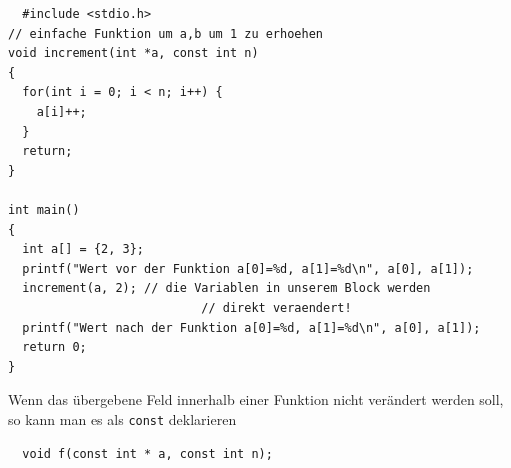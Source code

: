 \begin{minipage}{\linewidth}
\begin{lstlisting}
  #include <stdio.h>
// einfache Funktion um a,b um 1 zu erhoehen
void increment(int *a, const int n)
{
  for(int i = 0; i < n; i++) {
    a[i]++;
  }
  return;
}

int main()
{
  int a[] = {2, 3};
  printf("Wert vor der Funktion a[0]=%d, a[1]=%d\n", a[0], a[1]);
  increment(a, 2); // die Variablen in unserem Block werden
                           // direkt veraendert!
  printf("Wert nach der Funktion a[0]=%d, a[1]=%d\n", a[0], a[1]);
  return 0;
}
\end{lstlisting}
\end{minipage}
Wenn das übergebene Feld innerhalb einer Funktion nicht verändert werden soll, so kann man es als \verb|const| deklarieren 
\begin{lstlisting}
  void f(const int * a, const int n);
\end{lstlisting}

